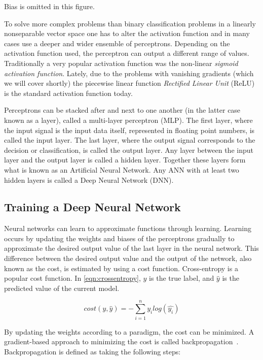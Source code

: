 \documentclass[english, bibtex]{kththesis}
\begin{document}
\begin{center}
Bias is omitted in this figure.
\end{center}

To solve more complex problems than binary classification problems in a linearly nonseparable vector space one has to alter the activation function and in many cases use a deeper and wider ensemble of perceptrons. Depending on the activation function used, the perceptron can output a different range of values. Traditionally a very popular activation function was the non-linear \textit{sigmoid activation function}. Lately, due to the problems with vanishing gradients (which we will cover shortly) the piecewise linear function \textit{Rectified Linear Unit} (ReLU) is the standard activation function today.

Perceptrons can be stacked after and next to one another (in the latter case known as a layer), called a multi-layer perceptron (MLP). The first layer, where the input signal is the input data itself, represented in floating point numbers, is called the input layer. The last layer, where the output signal corresponds to the decision or classification, is called the output layer. Any layer between the input layer and the output layer is called a hidden layer. Together these layers form what is known as an Artificial Neural Network. Any ANN with at least two hidden layers is called a Deep Neural Network (DNN).



\subsection{Training a Deep Neural Network}

Neural networks can learn to approximate functions through learning. Learning occurs by updating the weights and biases of the perceptrons gradually to approximate the desired output value of the last layer in the neural network. This difference between the desired output value and the output of the network, also known as the cost, is estimated by using a cost function. Cross-entropy is a popular cost function. In \autoref{eqn:crossentropy}, \(y\) is the true label, and \(\hat{y}\) is the predicted value of the current model.

\begin{equation}
    cost(y, \hat{y}) = - \sum\limits_{i=1}^{n} y_i log(\hat{y_i})
    \label{eqn:crossentropy}
\end{equation}

By updating the weights according to a paradigm, the cost can be minimized. A gradient-based approach to minimizing the cost is called backpropagation~\cite{Rumelhart1986}. Backpropagation is defined as taking the following steps:
\end{document}
